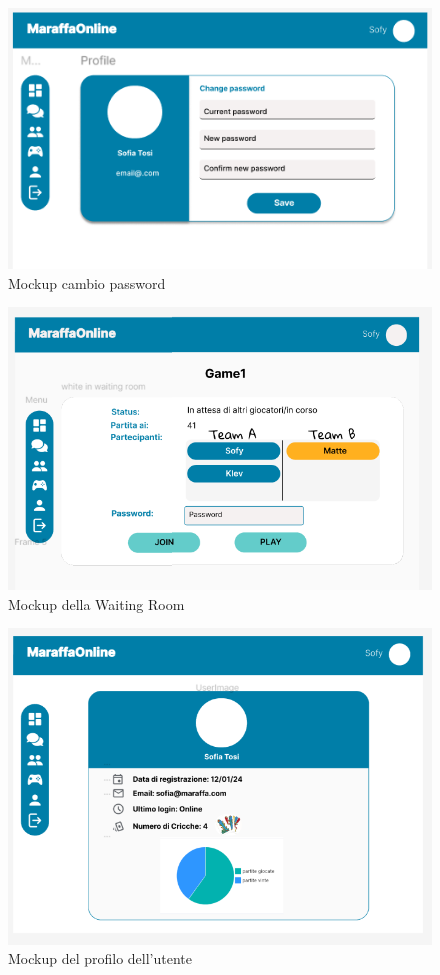 \begin{figure}[h!]
    \centering 
    \includegraphics[scale=0.75]{report/img/change_pwd_mockup.png}
    \caption{ Mockup cambio password}
    \label{mockup}
\end{figure}
\begin{figure}[h!]
    \centering 
    \includegraphics[scale=0.50]{report/img/waiting_room_mockup.png}
    \caption{Mockup della Waiting Room}
    \label{mockup}
\end{figure}
\begin{figure}[h!]
    \centering 
    \includegraphics[scale=0.65]{report/img/profilo_utente_mockup.png}
    \caption{Mockup del profilo dell'utente}
    \label{mockup}
\end{figure}
